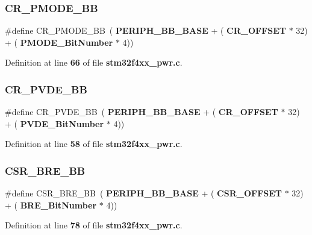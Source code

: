 \subsubsection{C\+R\+\_\+\+P\+M\+O\+D\+E\+\_\+\+BB}
{\footnotesize\ttfamily \#define C\+R\+\_\+\+P\+M\+O\+D\+E\+\_\+\+BB~(\textbf{ P\+E\+R\+I\+P\+H\+\_\+\+B\+B\+\_\+\+B\+A\+SE} + (\textbf{ C\+R\+\_\+\+O\+F\+F\+S\+ET} $\ast$ 32) + (\textbf{ P\+M\+O\+D\+E\+\_\+\+Bit\+Number} $\ast$ 4))}



Definition at line \textbf{ 66} of file \textbf{ stm32f4xx\+\_\+pwr.\+c}.

\mbox{\label{group__PWR_ga49f51ef8285a6be76fd204d49a00709c}} 
\subsubsection{C\+R\+\_\+\+P\+V\+D\+E\+\_\+\+BB}
{\footnotesize\ttfamily \#define C\+R\+\_\+\+P\+V\+D\+E\+\_\+\+BB~(\textbf{ P\+E\+R\+I\+P\+H\+\_\+\+B\+B\+\_\+\+B\+A\+SE} + (\textbf{ C\+R\+\_\+\+O\+F\+F\+S\+ET} $\ast$ 32) + (\textbf{ P\+V\+D\+E\+\_\+\+Bit\+Number} $\ast$ 4))}



Definition at line \textbf{ 58} of file \textbf{ stm32f4xx\+\_\+pwr.\+c}.

\mbox{\label{group__PWR_ga1451a5ec810860a7c2e28c23f0c0e928}} 
\subsubsection{C\+S\+R\+\_\+\+B\+R\+E\+\_\+\+BB}
{\footnotesize\ttfamily \#define C\+S\+R\+\_\+\+B\+R\+E\+\_\+\+BB~(\textbf{ P\+E\+R\+I\+P\+H\+\_\+\+B\+B\+\_\+\+B\+A\+SE} + (\textbf{ C\+S\+R\+\_\+\+O\+F\+F\+S\+ET} $\ast$ 32) + (\textbf{ B\+R\+E\+\_\+\+Bit\+Number} $\ast$ 4))}



Definition at line \textbf{ 78} of file \textbf{ stm32f4xx\+\_\+pwr.\+c}.

\mbox{\label{group__PWR_gaaff864595f697850b19173b0bca991b0}} 
